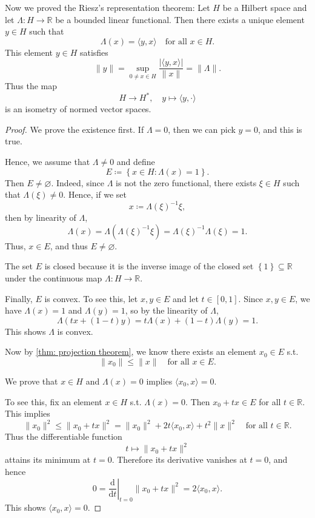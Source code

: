 Now we proved the Riesz's representation theorem:
    Let \(H\) be a Hilbert space and let \(\Lambda : H \to \mathbb{R}\) be a bounded linear functional. Then there exists a unique element \(y \in H\) such that 
    \[
        \Lambda (x) = \langle y, x \rangle \quad \text{for all } x \in H.  
    \]  
    This element \(y \in H\) satisfies 
    \[
        \lVert y \rVert = \sup _{0 \neq x \in H} \frac{\vert \langle y, x \rangle  \vert }{\lVert x \rVert } = \lVert \Lambda \rVert.  
    \] 
    Thus the map 
    \[
        H \to H^*, \quad y \mapsto \langle y, \cdot \rangle 
    \]
    is an isometry of normed vector spaces.

\begin{proof}
    We prove the existence first. If \(\Lambda = 0\), then we can pick \(y = 0\), and this is true. 

    Hence, we assume that \(\Lambda \neq 0\) and define 
    \[
        E \coloneqq \left\{ x \in H: \Lambda (x) = 1 \right\}.
    \]
    Then \(E \neq \varnothing\). Indeed, since \(\Lambda \) is not the zero functional, there exists \(\xi \in H\) such that \(\Lambda (\xi ) \neq 0\). Hence, if we set 
    \[
        x \coloneqq \Lambda (\xi )^{-1} \xi,
    \]    
    then by linearity of \(\Lambda\), 
    \[
        \Lambda (x) = \Lambda \left( \Lambda (\xi )^{-1} \xi  \right) = \Lambda (\xi )^{-1} \Lambda (\xi ) = 1. 
    \]
    Thus, \(x \in E\), and thus \(E \neq \varnothing\). 

    The set \(E\) is closed because it is the inverse image of the closed set \(\left\{ 1 \right\} \subseteq \mathbb{R} \) under the continuous map \(\Lambda : H \to \mathbb{R}\).

    Finally, \(E\) is convex. To see this, let \(x, y \in E\) and let \(t \in [0, 1]\). Since \(x, y \in E\), we have \(\Lambda (x) = 1\) and \(\Lambda (y) = 1\), so by the linearity of \(\Lambda\), 
    \[
        \Lambda \left( tx + (1 - t)y \right) = t \Lambda (x) + (1 - t) \Lambda (y) = 1. 
    \]            
    This shows \(\Lambda\) is convex.

    Now by \autoref{thm: projection theorem}, we know there exists an element \(x_0 \in E\) s.t. 
    \[
        \lVert x_0 \rVert \le \lVert x \rVert \quad \text{for all } x \in E.   
    \]   

    We prove that \(x \in H\) and \(\Lambda (x) = 0\) implies \(\langle x_0, x \rangle = 0 \). 

    To see this, fix an element \(x \in H\) s.t. \(\Lambda (x) = 0\). Then \(x_0 + tx \in E\) for all \(t \in \mathbb{R}\). This implies 
    \[
        \lVert x_0 \rVert^2 \le \lVert x_0 + tx \rVert^2 = \lVert x_0 \rVert^2 + 2 t \langle x_0, x \rangle + t^2 \lVert x \rVert^2 \quad \text{for all } t \in \mathbb{R}.      
    \]    
    Thus the differentiable function 
    \[
        t \mapsto \lVert x_0 + tx \rVert^2 
    \]
    attains its minimum at \(t = 0\). Therefore its derivative vanishes at \(t = 0\), and hence 
    \[
        0 = \left. \frac{\mathrm{d}}{\mathrm{d}t} \right\vert_{t = 0} \lVert x_0 + tx \rVert^2 = 2 \langle x_0, x \rangle. 
    \]
    This shows \(\langle x_0, x \rangle = 0 \). 


\end{proof}
